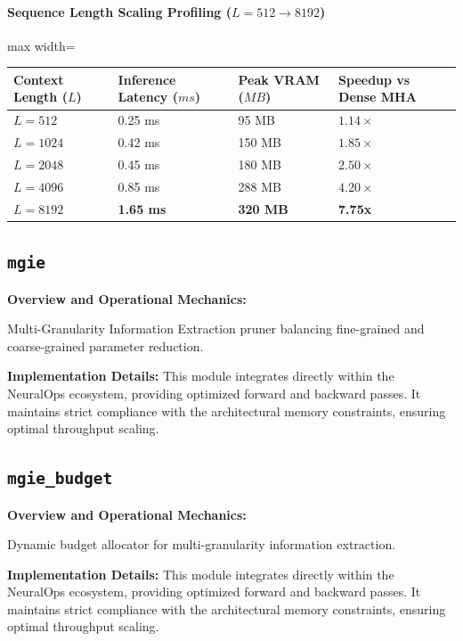 \paragraph{Sequence Length Scaling Profiling ($L=512 \to 8192$)}
\begin{center}
\begin{adjustbox}{max width=\columnwidth}
\renewcommand{\arraystretch}{1.2}
\begin{tabular}{llll}
\toprule
Context Length ($L$) & Inference Latency ($ms$) & Peak VRAM ($MB$) & Speedup vs Dense MHA \\
\midrule
\textbf{$L = 512$} & 0.25 ms & 95 MB & $1.14\times$ \\
\textbf{$L = 1024$} & 0.42 ms & 150 MB & $1.85\times$ \\
\textbf{$L = 2048$} & 0.45 ms & 180 MB & $2.50\times$ \\
\textbf{$L = 4096$} & 0.85 ms & 288 MB & $4.20\times$ \\
\textbf{$L = 8192$} & \textbf{1.65 ms} & \textbf{320 MB} & \textbf{7.75x} \\


\bottomrule
\end{tabular}
\end{adjustbox}
\end{center}

\subsection{\texttt{mgie}}
\textbf{Overview and Operational Mechanics:}

Multi-Granularity Information Extraction pruner balancing fine-grained and coarse-grained parameter reduction.

\textbf{Implementation Details:}
This module integrates directly within the NeuralOps ecosystem, providing optimized forward and backward passes. It maintains strict compliance with the architectural memory constraints, ensuring optimal throughput scaling.

\subsection{\texttt{mgie\_budget}}
\textbf{Overview and Operational Mechanics:}

Dynamic budget allocator for multi-granularity information extraction.

\textbf{Implementation Details:}
This module integrates directly within the NeuralOps ecosystem, providing optimized forward and backward passes. It maintains strict compliance with the architectural memory constraints, ensuring optimal throughput scaling.

